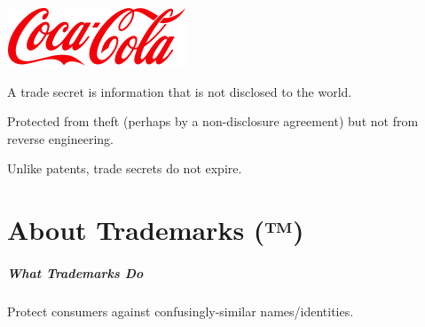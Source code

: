 \begin{frame}
\Large
\begin{changemargin}{1cm}

\begin{center}
\includegraphics[width=.4\textwidth]{images/L04-coca-cola.png}
\end{center}
A trade secret is information that is not disclosed to the world.

Protected from theft (perhaps by a non-disclosure agreement)
but not from reverse engineering.

Unlike patents, trade secrets do not expire.

\end{changemargin}
\end{frame}

\part{About Trademarks (™)}
\begin{frame}
\partpage
\end{frame}

\begin{frame}
\frametitle{What Trademarks Do}
\Large
\vspace*{-2em}
\begin{changemargin}{1cm}
Protect consumers against confusingly-similar names/identities.
\end{changemargin}
\end{frame}




